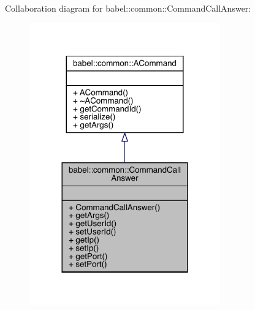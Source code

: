 Collaboration diagram for babel\+:\+:common\+:\+:Command\+Call\+Answer\+:\nopagebreak
\begin{figure}[H]
\begin{center}
\leavevmode
\includegraphics[width=233pt]{classbabel_1_1common_1_1_command_call_answer__coll__graph}
\end{center}
\end{figure}
